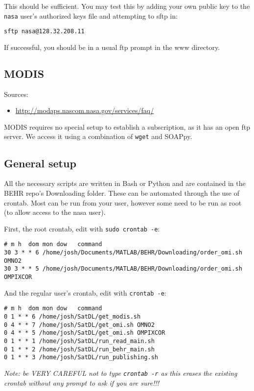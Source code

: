 \documentclass[12pt]{article}
\begin{document}
	This should be sufficient. You may test this by adding your own public key to the \lstinline$nasa$ user's authorized keys file and attempting to sftp in:
\begin{lstlisting}
sftp nasa@128.32.208.11
\end{lstlisting}
If successful, you should be in a usual ftp prompt in the www directory.

\subsection{MODIS}
	Sources:
	\begin{itemize}
	\item \url{http://modaps.nascom.nasa.gov/services/faq/}
	\end{itemize}
	MODIS requires no special setup to establish a subscription, as it has an open ftp server. We access it using a combination of \lstinline$wget$ and SOAPpy.
	
\subsection{General setup}
	All the necessary scripts are written in Bash or Python and are contained in the BEHR repo's Downloading folder. These can be automated through the use of crontab. Most can be run from your user, however some need to be run as root (to allow access to the nasa user).
	
	First, the root crontab, edit with \lstinline$sudo crontab -e$:
	\begin{lstlisting}[basicstyle=\ttfamily\scriptsize]
# m h  dom mon dow   command
30 3 * * 6 /home/josh/Documents/MATLAB/BEHR/Downloading/order_omi.sh OMNO2
30 3 * * 5 /home/josh/Documents/MATLAB/BEHR/Downloading/order_omi.sh OMPIXCOR
	\end{lstlisting}
	
	And the regular user's crontab, edit with \lstinline$crontab -e$:
	\begin{lstlisting}[basicstyle=\ttfamily\scriptsize]
# m h  dom mon dow   command
0 1 * * 6 /home/josh/SatDL/get_modis.sh
0 4 * * 7 /home/josh/SatDL/get_omi.sh OMNO2
0 4 * * 5 /home/josh/SatDL/get_omi.sh OMPIXCOR
0 1 * * 1 /home/josh/SatDL/run_read_main.sh
0 1 * * 2 /home/josh/SatDL/run_behr_main.sh
0 1 * * 3 /home/josh/SatDL/run_publishing.sh
	\end{lstlisting}

	\emph{Note: be VERY CAREFUL not to type \lstinline$crontab -r$ as this erases the existing crontab without any prompt to ask if you are sure!!!}	
	
\end{document}
